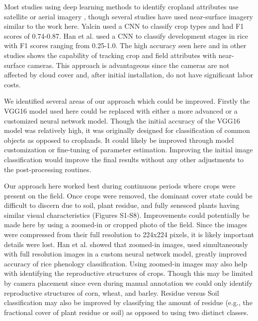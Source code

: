 \documentclass{article}
\begin{document}
Most studies using deep learning methods to identify cropland attributes use satellite or aerial imagery \citep{benos2021}, though several studies have used near-surface imagery similar to the work here. Yalcin \citeyear{yalcin2017} used a CNN to classify crop types and had F1 scores of 0.74-0.87. Han et al. \citeyear{han-shi2021} used a CNN to classify development stages in rice with F1 scores ranging from 0.25-1.0.  The high accuracy seen here and in other studies shows the capability of tracking crop and field attributes with near-surface cameras. This approach is advantageous since the cameras are not affected by cloud cover and, after initial installation, do not have significant labor costs. 

We identified several areas of our approach which could be improved. Firstly the VGG16 model used here could be replaced with either a more advanced or a customized neural network model. Though the initial accuracy of the VGG16 model was relatively high, it was originally designed for classification of common objects as opposed to croplands. It could likely be improved through model customization or fine-tuning of parameter estimation. Improving the initial image classification would improve the final results without any other adjustments to the post-processing routines. 

Our approach here worked best during continuous periods where crops were present on the field. Once crops were removed, the dominant cover state could be difficult to discern due to soil, plant residue, and fully senesced plants having similar visual characteristics (Figures S1-S8). Improvements could potentially be made here by using a zoomed-in or cropped photo of the field. Since the images were compressed from their full resolution to 224x224 pixels, it is likely important details were lost. Han et al. \citeyear{han-shi2021} showed that zoomed-in images, used simultaneously with full resolution images in a custom neural network model, greatly improved accuracy of rice phenology classification. Using zoomed-in images may also help with identifying the reproductive structures of crops. Though this may be limited by camera placement since even during manual annotation we could only identify reproductive structures of corn, wheat, and barley. Residue versus Soil classification may also be improved by classifying the amount of residue (e.g., the fractional cover of plant residue or soil) as opposed to using two distinct classes. 
\end{document}
